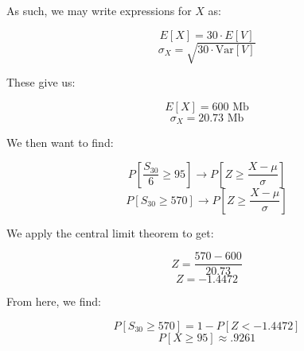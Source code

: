 \begin{enumerate}
    As such, we may write expressions for $X$ as:

    $$E[X]=30\cdot E[V]$$
    $$\sigma_X=\sqrt{30\cdot \text{Var}[V]}$$

    These give us:

    $$E[X]=600\text{ Mb}$$
    $$\sigma_X=20.73\text{ Mb}$$

    We then want to find:

    $$P\left[ \frac{S_{30}}{6}\geq95 \right]\to P\left[ Z\geq \frac{X-\mu}{\sigma}\right]$$
    $$P\left[ S_{30}\geq 570 \right]\to P\left[ Z\geq \frac{X-\mu}{\sigma}\right]$$

    We apply the central limit theorem to get:

    $$Z=\frac{570-600}{20.73}$$
    $$Z=-1.4472$$

    From here, we find:

    $$P\left[ S_{30}\geq 570 \right]= 1-P[Z< -1.4472]$$
    $$\boxed{P\left[ X\geq 95 \right]\approx .9261}$$

\end{enumerate}



